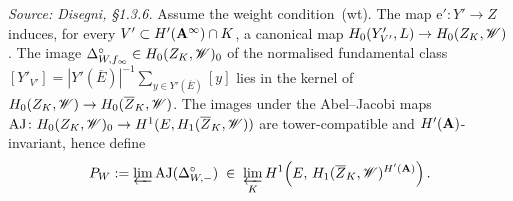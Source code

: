 \begin{definition}
  \label{def:HeegnerCycle}
  \textit{Source: Disegni, §1.3.6.}
  Assume the weight condition~(wt).  The map $\mathrm{e}' \colon Y' \to Z$
  induces, for every $V' \subset H'(\mathbf{A}^\infty) \cap K$, a canonical
  map $H_0(Y'_{V'}, L) \to H_0(Z_K, \mathscr{W})$.  The image
  $\Delta^\circ_{W,f_\infty} \in H_0(Z_K, \mathscr{W})_0$ of the normalised
  fundamental class $[Y'_{V'}] = |Y'(\overline{E})|^{-1}\sum_{y \in
  Y'(\overline{E})} [y]$ lies in the kernel of
  $H_0(Z_K, \mathscr{W}) \to H_0(\overline{Z}_K, \mathscr{W})$.  The images under the
  Abel--Jacobi maps
  $\mathrm{AJ} \colon H_0(Z_K, \mathscr{W})_0 \to H^1(E, H_1(\overline{Z}_K,
  \mathscr{W}))$ are tower-compatible and $H'(\mathbf{A})$-invariant, hence define
  \[
    P_W := \varprojlim \mathrm{AJ}(\Delta^\circ_{W,-})
    \;\in\; \varprojlim_K H^1\!\left(E,\,
    H_1(\overline{Z}_K, \mathscr{W})^{H'(\mathbf{A})}\right).
  \]
\end{definition}

